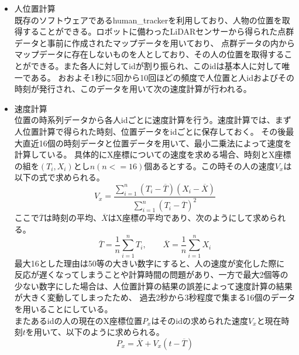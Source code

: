 \documentclass{kuisthesis}
\begin{document}
\begin{itemize}
  \item 人位置計算 \\
  既存のソフトウェアであるhuman\_trackerを利用しており、人物の位置を取得することができる。ロボットに備わったLiDARセンサーから得られた点群データと事前に作成されたマップデータを用いており、
  点群データの内からマップデータに存在しないものを人としており、その人の位置を取得することができる。また各人に対してidが割り振られ、このidは基本人に対して唯一である。
  おおよそ1秒に5回から10回ほどの頻度で人位置と人idおよびその時刻が発行され、このデータを用いて次の速度計算が行われる。
  \item 速度計算 \\
  位置の時系列データから各人idごとに速度計算を行う。速度計算では、まず人位置計算で得られた時刻、位置データをidごとに保存しておく。
  その後最大直近16個の時刻データと位置データを用いて、最小二乗法によって速度を計算している。
  具体的にX座標についての速度を求める場合、時刻とX座標の組を$(T_i, X_i)$とし$n(n <= 16)$個あるとする。この時その人の速度$V_x$は以下の式で求められる。
  \begin{equation}
    V_x = \frac{\sum_{i=1}^{n} (T_i - \overline{T})(X_i - \overline{X})}{\sum_{i=1}^{n} (T_i - \overline{T})^2}
  \end{equation}
  ここで$\overline{T}$は時刻の平均、$\overline{X}$はX座標の平均であり、次のようにして求められる。
  \begin{equation}
    \overline{T} = \frac{1}{n}\sum_{i=1}^{n} T_i, \qquad \overline{X} = \frac{1}{n}\sum_{i=1}^{n} X_i
  \end{equation}
  最大16とした理由は50等の大きい数字にすると、人の速度が変化した際に
  反応が遅くなってしまうことや計算時間の問題があり、一方で最大2個等の少ない数字にした場合は、人位置計算の結果の誤差によって速度計算の結果が大きく変動してしまったため、
  過去2秒から3秒程度で集まる16個のデータを用いることにしている。\\
  \quad またあるidの人の現在のX座標位置$P_x$はそのidの求められた速度$V_x$と現在時刻$t$を用いて、以下のように求められる。
  \begin{equation}
    P_x = \overline{X} + V_x(t - \overline{T})
  \end{equation}
  

\end{itemize}
\end{document}
